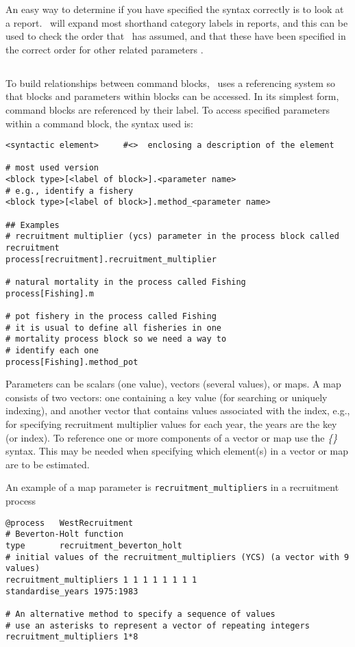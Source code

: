 An easy way to determine if you have specified the syntax correctly is to look at a report. \CNAME\ will expand most shorthand category labels in reports, and this can be used to check the order that \CNAME\ has assumed, and that these have been specified in the correct order for other related parameters . 

\subsection{\label{sec:params}}

To build relationships between command blocks, \CNAME\ uses  a referencing system so that blocks and parameters within blocks can be accessed. In its simplest form, command blocks are referenced by their label. To access specified parameters within a command block, the syntax used is:

{\small{\begin{verbatim}
<syntactic element>     #<>  enclosing a description of the element

# most used version
<block type>[<label of block>].<parameter name>
# e.g., identify a fishery
<block type>[<label of block>].method_<parameter name>

## Examples
# recruitment multiplier (ycs) parameter in the process block called recruitment
process[recruitment].recruitment_multiplier

# natural mortality in the process called Fishing
process[Fishing].m

# pot fishery in the process called Fishing
# it is usual to define all fisheries in one
# mortality process block so we need a way to
# identify each one
process[Fishing].method_pot
\end{verbatim}}}

Parameters can be scalars (one value), vectors (several values), or maps. A map consists of two vectors: one containing a key value (for searching or uniquely indexing), and another vector that contains values associated with the index, e.g., for specifying recruitment multiplier values for each year, the years are the key (or index). To reference one or more components of a vector or map use the \textit{\{\}} syntax. This may be needed when specifying which element(s) in a vector or map are to be estimated.

An example of a map parameter is \texttt{recruitment\_multipliers} in a recruitment process

{\small{\begin{verbatim}
@process   WestRecruitment
# Beverton-Holt function
type       recruitment_beverton_holt
# initial values of the recruitment_multipliers (YCS) (a vector with 9 values)
recruitment_multipliers 1 1 1 1 1 1 1 1
standardise_years 1975:1983

# An alternative method to specify a sequence of values
# use an asterisks to represent a vector of repeating integers
recruitment_multipliers 1*8
\end{verbatim}}}

